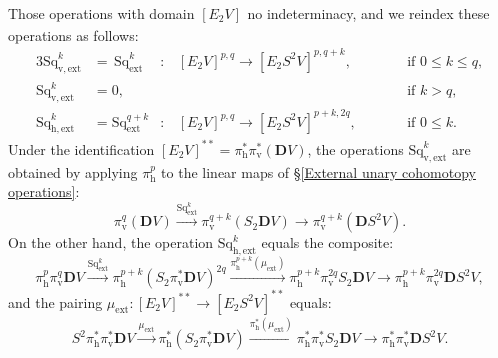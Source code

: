 \documentclass[11pt]{amsart} \renewcommand{\baselinestretch}{1.4}
\theoremstyle{plain}
\theoremstyle{definition}
\renewcommand{\to}{\longrightarrow}
\newcommand{\ExtCohOp}{\mathrm{Sq}_\mathrm{ext}}
\newcommand{\vExtCohOp}{\mathrm{Sq}_\mathrm{v,ext}}
\newcommand{\hExtCohOp}{\mathrm{Sq}_\mathrm{h,ext}}
\newcommand{\ExtCohProd}{\mu_\mathrm{ext}}
\newcommand{\Edown}[4]{[E_{#1}#2]^{#3}_{#4}}
\newcommand{\dver}{_\mathrm{v}}
\newcommand{\dhor}{_\mathrm{h}}
\newcommand{\dual}{\mathbf{D}}
\begin{document}
\begin{Operations in composite functor spectral sequences}
Those operations with domain $\Edown{2}{V}{}{}$ no indeterminacy, and we reindex these operations as follows: %
\begin{alignat*}{3}
\vExtCohOp^k&=\,\ExtCohOp^k&:\,&\Edown{2}{V}{p,q}{}\to \Edown{2}{S^2V}{p,q+k}{},&\qquad&\text{if }0\leq k \leq q,\\
\vExtCohOp^k&=0,&&&&\text{if }k > q,\\
\hExtCohOp^k&=\ExtCohOp^{q+k}&:\,&\Edown{2}{V}{p,q}{}\to \Edown{2}{S^2V}{p+k,2q}{},&\qquad&\text{if }0\leq k.
\end{alignat*}
Under the identification $\Edown{2}{V}{**}{}=\pi\dhor^{*}\pi\dver^{*}(\dual V)$, the operations $\vExtCohOp^k$ %
are  obtained by applying $\pi\dhor^p$ to the linear maps of \S\ref{External unary cohomotopy operations}:
\[\pi\dver^{q}(\dual V)\overset{\ExtCohOp^k}{\to} \pi\dver^{q+k}(S_2\dual V)\to \pi\dver^{q+k}(\dual S^2V).\]
On the other hand, the operation $\hExtCohOp^k$ equals the composite:
\[\pi\dhor^p\pi\dver^q\dual V
\overset{\ExtCohOp^k}{\to} 
\pi\dhor^{p+k}(S_2\pi\dver^*\dual V)^{2q}
\overset{\pi\dhor^{p+k}(\ExtCohProd)}{\to}
\pi\dhor^{p+k}\pi\dver^{2q}S_2\dual V
\to 
\pi\dhor^{p+k}\pi\dver^{2q}\dual S^2 V,
\]
 and the pairing $\ExtCohProd:\Edown{2}{V}{**}{}\to \Edown{2}{S^2V}{**}{}$ equals:
\[S^2\pi\dhor^*\pi\dver^*\dual V
\overset{\ExtCohProd}{\to} 
\pi\dhor^*(S_2\pi\dver^*\dual V)
\overset{\pi\dhor^{*}(\ExtCohProd)}{\to}
\pi\dhor^{*}\pi\dver^{*}S_2\dual V
\to 
\pi\dhor^{*}\pi\dver^{*}\dual S^2 V.
\]


\end{Operations in composite functor spectral sequences}
\end{document}

